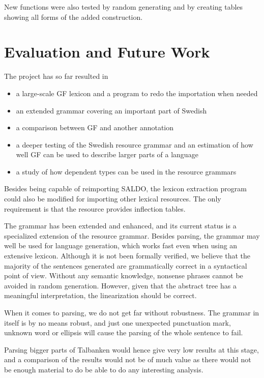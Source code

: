 \documentclass[10pt, a4paper]{article}
\begin{document}
New functions were also tested by random generating and by creating tables showing
all forms of the added construction.

\section{Evaluation and Future Work}
The project has so far resulted in
\begin{itemize}
\item a large-scale GF lexicon and a program to redo the importation when needed
\item an extended grammar covering an important part of Swedish
\item a comparison between GF and another annotation
\item a deeper testing of the Swedish resource grammar and an estimation
of how well GF can be used to describe larger parts of a language
\item a study of how dependent types can be used in the resource grammars
\end{itemize}

Besides being capable of reimporting SALDO, the lexicon extraction program could also
be modified for importing other lexical resources. The only requirement is that
the resource provides inflection tables.

The grammar has been extended and enhanced, and its current status is
a specialized extension of the resource grammar.
Besides parsing, the grammar may well be used for language generation,
which works fast even when using an extensive lexicon.
Although it is not been formally verified, we believe that the majority of the
sentences generated are grammatically correct in a syntactical point of view.
Without any semantic knowledge, nonsense phrases cannot be avoided in
random generation. However, given that the abstract tree has a meaningful
interpretation,
the linearization should be correct.

When it comes to parsing, we do not get far without robustness.
The grammar in itself is by no means robust, and just one 
unexpected punctuation mark, unknown word
or ellipsis will cause the parsing of the whole sentence to fail. 

Parsing bigger parts of Talbanken would hence give very low results at this stage, 
and a comparison of the results would not be of much value as
there would not be enough material %
to do be able to do any interesting analysis.
\end{document}
